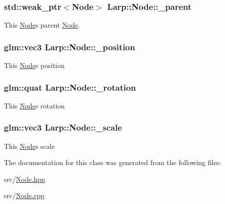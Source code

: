 \subsubsection[{\texorpdfstring{\+\_\+parent}{_parent}}]{\setlength{\rightskip}{0pt plus 5cm}std\+::weak\+\_\+ptr$<${\bf Node}$>$ Larp\+::\+Node\+::\+\_\+parent\hspace{0.3cm}{\ttfamily [private]}}\hypertarget{classLarp_1_1Node_a416307326769655e02fbb0b231307711}{}\label{classLarp_1_1Node_a416307326769655e02fbb0b231307711}
This \hyperlink{classLarp_1_1Node}{Node}\textquotesingle{}s parent \hyperlink{classLarp_1_1Node}{Node}. 
\subsubsection[{\texorpdfstring{\+\_\+position}{_position}}]{\setlength{\rightskip}{0pt plus 5cm}glm\+::vec3 Larp\+::\+Node\+::\+\_\+position\hspace{0.3cm}{\ttfamily [private]}}\hypertarget{classLarp_1_1Node_a060f49eb175b70c9e0da515fa685f1f2}{}\label{classLarp_1_1Node_a060f49eb175b70c9e0da515fa685f1f2}
This \hyperlink{classLarp_1_1Node}{Node}\textquotesingle{}s position 
\subsubsection[{\texorpdfstring{\+\_\+rotation}{_rotation}}]{\setlength{\rightskip}{0pt plus 5cm}glm\+::quat Larp\+::\+Node\+::\+\_\+rotation\hspace{0.3cm}{\ttfamily [private]}}\hypertarget{classLarp_1_1Node_a3bf60bf55c2cda89031f9327fafa0d17}{}\label{classLarp_1_1Node_a3bf60bf55c2cda89031f9327fafa0d17}
This \hyperlink{classLarp_1_1Node}{Node}\textquotesingle{}s rotation 
\subsubsection[{\texorpdfstring{\+\_\+scale}{_scale}}]{\setlength{\rightskip}{0pt plus 5cm}glm\+::vec3 Larp\+::\+Node\+::\+\_\+scale\hspace{0.3cm}{\ttfamily [private]}}\hypertarget{classLarp_1_1Node_ae295b7db9065cd5bcc1edb32af6e7987}{}\label{classLarp_1_1Node_ae295b7db9065cd5bcc1edb32af6e7987}
This \hyperlink{classLarp_1_1Node}{Node}\textquotesingle{}s scale 

The documentation for this class was generated from the following files\+:\begin{DoxyCompactItemize}
\item 
src/\hyperlink{Node_8hpp}{Node.\+hpp}\item 
src/\hyperlink{Node_8cpp}{Node.\+cpp}\end{DoxyCompactItemize}
